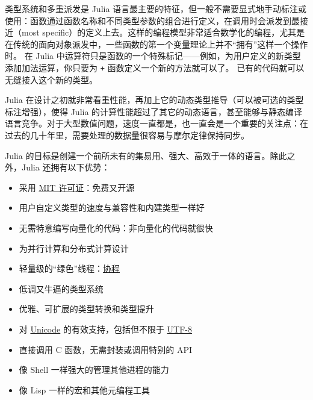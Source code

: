 类型系统和多重派发是 Julia 语言最主要的特征，但一般不需要显式地手动标注或使用：函数通过函数名称和不同类型参数的组合进行定义，在调用时会派发到最接近（most specific）的定义上去。这样的编程模型非常适合数学化的编程，尤其是在传统的面向对象派发中，一些函数的第一个变量理论上并不“拥有”这样一个操作时。 在 Julia 中运算符只是函数的一个特殊标记——例如，为用户定义的新类型添加加法运算，你只要为 \texttt{+} 函数定义一个新的方法就可以了。 已有的代码就可以无缝接入这个新的类型。



Julia 在设计之初就非常看重性能，再加上它的动态类型推导（可以被可选的类型标注增强），使得 Julia 的计算性能超过了其它的动态语言，甚至能够与静态编译语言竞争。对于大型数值问题，速度一直都是，也一直会是一个重要的关注点：在过去的几十年里，需要处理的数据量很容易与摩尔定律保持同步。



Julia 的目标是创建一个前所未有的集易用、强大、高效于一体的语言。除此之外，Julia 还拥有以下优势：



\begin{itemize}
\item 采用 \href{https://github.com/JuliaLang/julia/blob/master/LICENSE.md}{MIT 许可证}：免费又开源


\item 用户自定义类型的速度与兼容性和内建类型一样好


\item 无需特意编写向量化的代码：非向量化的代码就很快


\item 为并行计算和分布式计算设计


\item 轻量级的“绿色”线程：\href{https://en.wikipedia.org/wiki/Coroutine}{协程}


\item 低调又牛逼的类型系统


\item 优雅、可扩展的类型转换和类型提升


\item 对 \href{https://en.wikipedia.org/wiki/Unicode}{Unicode} 的有效支持，包括但不限于 \href{https://en.wikipedia.org/wiki/UTF-8}{UTF-8}


\item 直接调用 C 函数，无需封装或调用特别的 API


\item 像 Shell 一样强大的管理其他进程的能力


\item 像 Lisp 一样的宏和其他元编程工具

\end{itemize}
